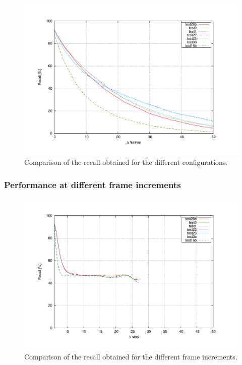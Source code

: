 \begin{figure}[h!]
\centering
\includegraphics[trim=50 40 80 60,clip]{recall_vs_delta_frames}
\caption{Comparison of the recall obtained for the different configurations.}\label{fig:cp04_recall_vs_delta_frames}
\end{figure}

\subsubsection{Performance at different frame increments}\label{ch:chapter04_02_03_02}

\begin{figure}[h!]
\centering
\includegraphics[trim=50 40 80 60,clip]{increments}
\caption{Comparison of the recall obtained for the different frame increments.}\label{fig:cp04_increments}
\end{figure}


